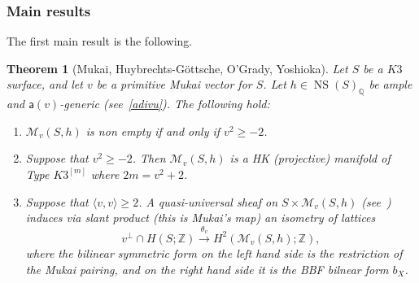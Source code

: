 \documentclass[11pt]{amsart}
\newcommand{\QQ}{{\mathbb Q}}
\newcommand{\ZZ}{{\mathbb Z}}
\let\mathcal\mathscr
\def\cM{\mathcal{M}}
\DeclareMathOperator{\NS}{NS}
\newcommand{\la}{\langle}
\newcommand{\ra}{\rangle}
\newtheorem{thm}[lmm]{Theorem}
\theoremstyle{definition}
\theoremstyle{remark}
\begin{document}
%
\subsubsection{Main results}
%
The first main result is the following. 
%
\begin{thm}[Mukai, Huybrechts-G\"ottsche, O'Grady, Yoshioka]\label{thm:vettmukprim}
%
Let $S$ be a $K3$ surface, and let $v$ be a primitive 
Mukai vector for $S$. Let $h\in\NS(S)_{\QQ}$ be ample and ${\mathsf a}(v)$-generic  (see~\eqref{adivu}). The following hold:
%
\begin{enumerate}
%
\item
%
$\cM_v(S,h)$ is non empty if and only if $v^2 \ge -2$.
%
\item
%
Suppose that  $v^2\ge -2$. Then $\cM_v(S,h)$ is a HK (projective) manifold of Type $K3^{[m]}$ where $2m=v^2+2$. 
%
\item
%
Suppose that  $\la v,v\ra\ge 2$. A quasi-universal sheaf on $S\times\cM_v(S,h)$ (see~\cite[App.2]{mukai:vbtata}) induces via slant product (this is \emph{Mukai's map}) an isometry of  lattices
%
\begin{equation}\label{mappamukai}
%
 v^{\bot}\cap H(S;\ZZ)\xrightarrow{\theta_v} H^2(\cM_v(S,h);\ZZ),
%
\end{equation}
%
where the bilinear symmetric form on the left hand side is the restriction of the Mukai pairing, and on the right hand side it is  the BBF bilnear form $b_X$. 
 
%
\end{enumerate}
%
%
\end{thm}
%
%
\end{document}
